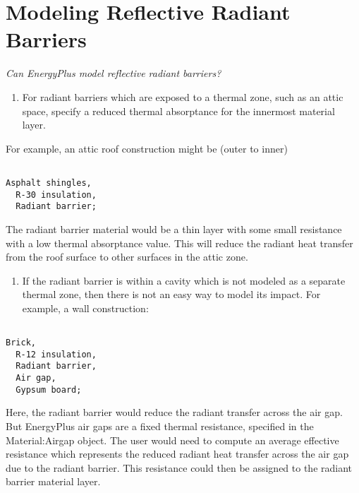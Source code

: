 \section{Modeling Reflective Radiant Barriers}\label{modeling-reflective-radiant-barriers}

\emph{Can EnergyPlus model reflective radiant barriers?}

\begin{enumerate}
\def\labelenumi{\arabic{enumi}.}
\tightlist
\item
  For radiant barriers which are exposed to a thermal zone, such as an attic space, specify a reduced thermal absorptance for the innermost material layer.
\end{enumerate}

For example, an attic roof construction might be (outer to inner)

\begin{lstlisting}

Asphalt shingles,
  R-30 insulation,
  Radiant barrier;
\end{lstlisting}

The radiant barrier material would be a thin layer with some small resistance with a low thermal absorptance value. This will reduce the radiant heat transfer from the roof surface to other surfaces in the attic zone.

\begin{enumerate}
\def\labelenumi{\arabic{enumi}.}
\setcounter{enumi}{1}
\tightlist
\item
  If the radiant barrier is within a cavity which is not modeled as a separate thermal zone, then there is not an easy way to model its impact. For example, a wall construction:
\end{enumerate}

\begin{lstlisting}

Brick,
  R-12 insulation,
  Radiant barrier,
  Air gap,
  Gypsum board;
\end{lstlisting}

Here, the radiant barrier would reduce the radiant transfer across the air gap. But EnergyPlus air gaps are a fixed thermal resistance, specified in the Material:Airgap object. The user would need to compute an average effective resistance which represents the reduced radiant heat transfer across the air gap due to the radiant barrier. This resistance could then be assigned to the radiant barrier material layer.
